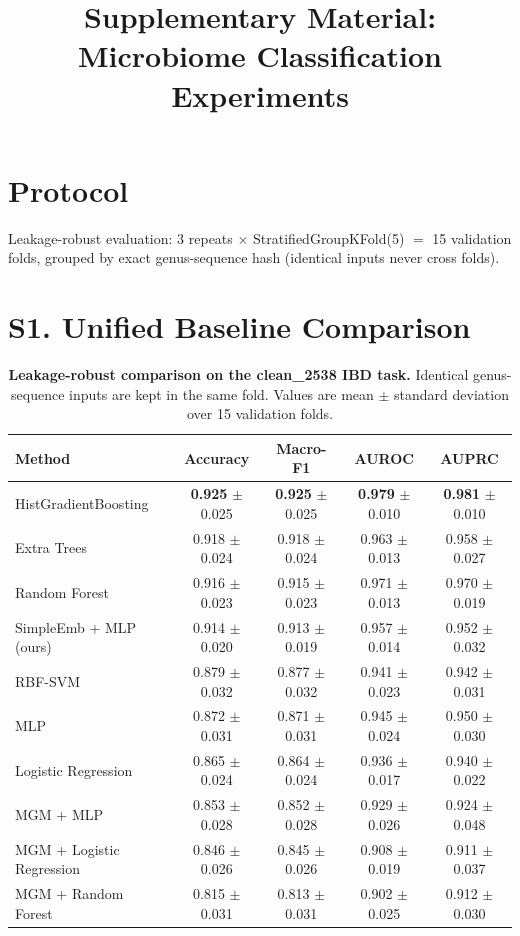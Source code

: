 \documentclass[11pt,a4paper]{article}
\title{Supplementary Material: Microbiome Classification Experiments}
\author{}
\date{}
\begin{document}
\maketitle

\section*{Protocol}
Leakage-robust evaluation: 3 repeats $\times$ StratifiedGroupKFold(5) $=$ 15 validation folds,
grouped by exact genus-sequence hash (identical inputs never cross folds).

\section*{S1. Unified Baseline Comparison}

\begin{table}[ht]
\centering
\caption{\textbf{Leakage-robust comparison on the clean\_2538 IBD task.}
Identical genus-sequence inputs are kept in the same fold.
Values are mean $\pm$ standard deviation over 15 validation folds.}
\label{tab:sup1}
\begin{tabular}{lcccc}
\toprule
\textbf{Method} & \textbf{Accuracy} & \textbf{Macro-F1} & \textbf{AUROC} & \textbf{AUPRC} \\
\midrule
HistGradientBoosting & \textbf{0.925} $\pm$ 0.025 & \textbf{0.925} $\pm$ 0.025 & \textbf{0.979} $\pm$ 0.010 & \textbf{0.981} $\pm$ 0.010 \\
Extra Trees & 0.918 $\pm$ 0.024 & 0.918 $\pm$ 0.024 & 0.963 $\pm$ 0.013 & 0.958 $\pm$ 0.027 \\
Random Forest & 0.916 $\pm$ 0.023 & 0.915 $\pm$ 0.023 & 0.971 $\pm$ 0.013 & 0.970 $\pm$ 0.019 \\
SimpleEmb + MLP (ours) & 0.914 $\pm$ 0.020 & 0.913 $\pm$ 0.019 & 0.957 $\pm$ 0.014 & 0.952 $\pm$ 0.032 \\
RBF-SVM & 0.879 $\pm$ 0.032 & 0.877 $\pm$ 0.032 & 0.941 $\pm$ 0.023 & 0.942 $\pm$ 0.031 \\
MLP & 0.872 $\pm$ 0.031 & 0.871 $\pm$ 0.031 & 0.945 $\pm$ 0.024 & 0.950 $\pm$ 0.030 \\
Logistic Regression & 0.865 $\pm$ 0.024 & 0.864 $\pm$ 0.024 & 0.936 $\pm$ 0.017 & 0.940 $\pm$ 0.022 \\
MGM + MLP & 0.853 $\pm$ 0.028 & 0.852 $\pm$ 0.028 & 0.929 $\pm$ 0.026 & 0.924 $\pm$ 0.048 \\
MGM + Logistic Regression & 0.846 $\pm$ 0.026 & 0.845 $\pm$ 0.026 & 0.908 $\pm$ 0.019 & 0.911 $\pm$ 0.037 \\
MGM + Random Forest & 0.815 $\pm$ 0.031 & 0.813 $\pm$ 0.031 & 0.902 $\pm$ 0.025 & 0.912 $\pm$ 0.030 \\
\bottomrule
\end{tabular}
\end{table}
\end{document}

